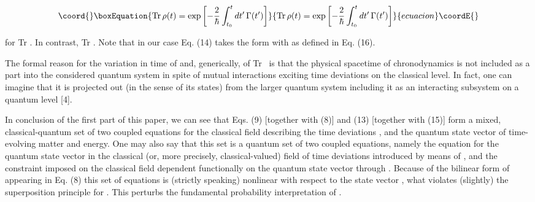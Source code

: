 \documentclass[a4paper,12pt]{article}
\begin{document}
\begin{equation}\coord{}\boxEquation{
{\rm Tr}\,\rho(t) = \exp\left[ -\frac{2}{\hbar} \int^t_{t_0} dt'\, \Gamma(t')\right] 
}{
{\rm Tr}\,\rho(t) = \exp\left[ -\frac{2}{\hbar} \int^t_{t_0} dt'\, \Gamma(t')\right] 
}{ecuacion}\coordE{}\end{equation}

\ni for Tr \coordHE{}. In contrast, Tr \coordHE{}. Note that in our case Eq. (14) takes the form
\coordHE{} with \coordHE{} as defined in Eq. (16).

The formal reason for the variation in time of \coordHE{} and, generically, of Tr~\coordHE{} is that the physical spacetime of chronodynamics is not included as a part into the considered quantum system in spite of mutual interactions exciting time deviations on the classical level. In fact, one can imagine that it is projected out (in the sense of its states) from the larger quantum system including it as an interacting subsystem on a quantum level [4].

In conclusion of the first part of this paper, we can see that Eqs. (9) [together with (8)] and (13) [together with (15)] form a mixed, classical-quantum set of two coupled equations for the classical field \coordHE{} describing the time deviations \coordHE{}, and the quantum state vector \coordHE{} of time-evolving matter and energy. One may also say that this set is a quantum set of two coupled equations, namely the equation for the quantum state vector \coordHE{} in the classical (or, more precisely, classical-valued) field \coordHE{} of time deviations introduced by means of \coordHE{}, and the constraint imposed on the classical field \coordHE{} dependent functionally on the quantum state vector \coordHE{} through \coordHE{}. Because of the bilinear form of \coordHE{} appearing in Eq. (8) this set of equations is (strictly speaking) nonlinear with respect to the state vector \coordHE{}, what violates (slightly) the superposition principle for \coordHE{}. This perturbs the fundamental probability interpretation of \coordHE{}.
\end{document}
